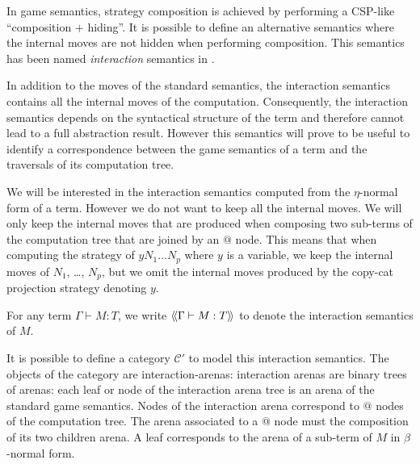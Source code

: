 In game semantics, strategy composition is achieved by performing a CSP-like ``composition + hiding''.
It is possible to define an alternative semantics where the internal moves are not hidden when performing composition.
This semantics has been named \emph{interaction} semantics in \cite{DBLP:conf/sas/DimovskiGL05}.

In addition to the moves of the standard semantics, the interaction semantics contains all
the internal moves of the computation.
Consequently, the interaction semantics depends on the syntactical structure of the term and therefore cannot
lead to a full abstraction result. However this semantics will prove to be useful to identify
a correspondence between the game semantics
of a term and the traversals of its computation tree.

We will be interested in the interaction semantics computed from the
$\eta$-normal form of a term. However we do not want to keep all the internal moves. We will only keep the internal
moves that are produced when composing two sub-terms of the computation tree that are joined by an $@$ node.
This means that when computing the strategy of
$y N_1 \ldots N_p$ where $y$ is a variable, we keep the internal moves of $N_1$, \ldots, $N_p$, but
we omit the internal moves produced by the copy-cat projection strategy denoting $y$.

For any term $\Gamma \vdash M : T$, we write ${\langle\!\langle \Gamma \vdash M : T \rangle\!\rangle}$ to denote the interaction semantics of $M$.

It is possible to define a category $\mathcal{C'}$ to model this interaction semantics. The objects of
the category are interaction-arenas: interaction arenas
are binary trees of arenas: each leaf or node of the interaction arena tree is an arena of the standard game semantics.
Nodes of the interaction arena correspond to $@$ nodes of the computation tree. The arena associated to a $@$ node must
the composition of its two children arena. A leaf corresponds to the arena of a sub-term of $M$ in $\beta$-normal form.

